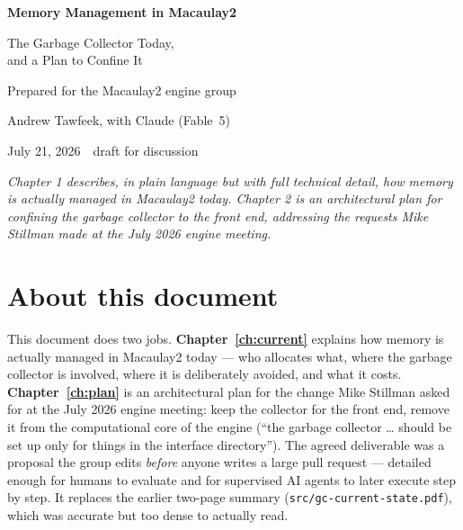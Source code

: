 \documentclass[11pt,oneside]{report}
\newcommand{\file}[1]{\textcolor{m2file}{\texttt{#1}}}
\begin{document}
\begin{titlepage}
\centering
\vspace*{2.2cm}
{\LARGE\bfseries Memory Management in Macaulay2\par}
\vspace{0.5cm}
{\Large The Garbage Collector Today,\\[2pt] and a Plan to Confine It\par}
\vspace{1.6cm}
{\large Prepared for the Macaulay2 engine group\par}
\vspace{0.4cm}
{\normalsize Andrew Tawfeek, with Claude (Fable~5)\par}
\vspace{0.4cm}
{\normalsize July 21, 2026 \,\textperiodcentered\, draft for discussion\par}
\vfill
\begin{minipage}{0.86\textwidth}
\small\itshape
Chapter 1 describes, in plain language but with full technical detail, how
memory is actually managed in Macaulay2 today. Chapter 2 is an architectural
plan for confining the garbage collector to the front end, addressing the
requests Mike Stillman made at the July 2026 engine meeting.
\end{minipage}
\vspace{1.2cm}
\end{titlepage}

\chapter*{About this document}
This document does two jobs. \textbf{Chapter~\ref{ch:current}} explains how
memory is actually managed in Macaulay2 today --- who allocates what, where
the garbage collector is involved, where it is deliberately avoided, and what
it costs. \textbf{Chapter~\ref{ch:plan}} is an architectural plan for the
change Mike Stillman asked for at the July 2026 engine meeting: keep the
collector for the front end, remove it from the computational core of the
engine (``the garbage collector \ldots{} should be set up only for things in
the interface directory''). The agreed deliverable was a proposal the group
edits \emph{before} anyone writes a large pull request --- detailed enough
for humans to evaluate and for supervised AI agents to later execute step by
step. It replaces the earlier two-page summary
(\file{src/gc-current-state.pdf}), which was accurate but too dense to
actually read.
\end{document}
